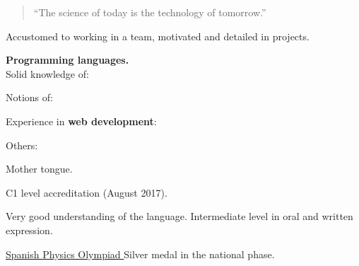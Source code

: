


\begin{quote}
  ``The science of today is the technology of tomorrow.''
\end{quote}


Accustomed to working in a team, motivated and detailed in projects.%
\divider{}

\textbf{Programming languages.}\\[.5ex]
Solid knowledge of:\\[-2ex]
\begin{center}
\end{center}

Notions of: \quad
{}
\vspace{.75ex}
\divider{}


Experience in \textbf{web development}:
\vspace{-.05cm}
\begin{center}
\end{center}
\divider[empty]{}

Others:
\cvtag{\LaTeX}


\medskip
{}

\smallskip
Mother tongue.
\divider{}

\smallskip
C1 level accreditation (August 2017).
\divider{}

\smallskip
Very good understanding of the language. Intermediate level in oral and written
expression.


\medskip
{}


\cvachievement{\faTrophy}
{\href{https://rsef.es/olimpiada-espanola-de-fisica}
  {Spanish Physics Olympiad \smallskip}}
{\small{}%
  \small{}}
Silver medal in the national phase.

